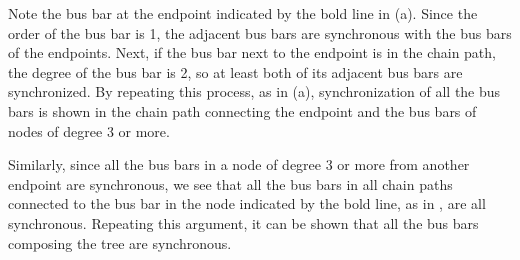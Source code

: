 \documentclass[tombow,dvipdfmx]{corona-a5-1.1}
\begin{document}
\begin{証明}
Note the bus bar at the endpoint indicated by the bold line in (a).
Since the order of the bus bar is 1, the adjacent bus bars are synchronous with the bus bars of the endpoints.
Next, if the bus bar next to the endpoint is in the chain path, the degree of the bus bar is 2, so at least both of its adjacent bus bars are synchronized.
By repeating this process, as in (a), synchronization of all the bus bars is shown in the chain path connecting the endpoint and the bus bars of nodes of degree 3 or more.

Similarly, since all the bus bars in a node of degree 3 or more from another endpoint are synchronous, we see that all the bus bars in all chain paths connected to the bus bar in the node indicated by the bold line, as in , are all synchronous.
Repeating this argument, it can be shown that all the bus bars composing the tree are synchronous.
\end{証明}
\end{document}
